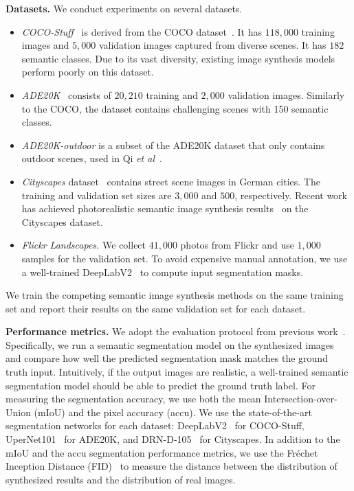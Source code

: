 {\bf Datasets.} We conduct experiments on several datasets.

\begin{itemize}[leftmargin=*,noitemsep,topsep=0pt]
\item \textit{COCO-Stuff}~\cite{caesar2018coco} is derived from the COCO dataset~\cite{lin2014microsoft}. It has $118,000$ training images and $5,000$ validation images captured from diverse scenes. It has $182$ semantic classes. Due to its vast diversity, existing image synthesis models perform poorly on this dataset.
\item \textit{ADE20K}~\cite{zhou2017scene} consists of $20,210$ training and $2,000$ validation images. Similarly to the COCO, the dataset contains challenging scenes with 150 semantic classes. 
\item \textit{ADE20K-outdoor} is a subset of the ADE20K dataset that only contains outdoor scenes, used in Qi \emph{et al}\onedot ~\cite{qi2018semi}. 
\item \textit{Cityscapes} dataset~\cite{cordts2016cityscapes} contains street scene images in German cities. The training and validation set sizes are $3,000$ and $500$, respectively. Recent work has achieved photorealistic semantic image synthesis results~\cite{wang2018video,qi2018semi} on the Cityscapes dataset. 
\item \textit{Flickr Landscapes.} We collect $41,000$ photos from Flickr and use $1,000$ samples for the validation set. To avoid expensive manual annotation, we use a well-trained DeepLabV2~\cite{chen2018deeplab} to compute input segmentation masks.
\end{itemize}

We train the competing semantic image synthesis methods on the same training set and report their results on the same validation set for each dataset.

{\bf Performance metrics.} We adopt the evaluation protocol from previous work~\cite{chen2017photographic,wang2018pix2pixHD}. Specifically, we run a semantic segmentation model on the synthesized images and compare how well the predicted segmentation mask matches the ground truth input. Intuitively, if the output images are realistic, a well-trained semantic segmentation model should be able to predict the ground truth label. For measuring the segmentation accuracy, we use both the mean Intersection-over-Union (mIoU) and the pixel accuracy (accu). We use the state-of-the-art segmentation networks for each dataset: DeepLabV2~\cite{chen2018deeplab,kazuto2018} for COCO-Stuff, UperNet101~\cite{xiao2018unified} for ADE20K, and DRN-D-105~\cite{yu2017dilated} for Cityscapes. In addition to the mIoU and the accu segmentation performance metrics, we use the Fr\'echet Inception Distance (FID)~\cite{heusel2017gans} to measure the distance between the distribution of synthesized results and the distribution of real images.

